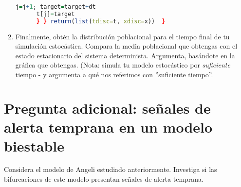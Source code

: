 \documentclass[10pt,letterpaper]{article}
\begin{document}
\begin{enumerate}
\begin{framed}
\begin{lstlisting}[language=R]
      j=j+1; target=target+dt
      t[j]=target
      } } return(list(tdisc=t, xdisc=x))  }
  \end{lstlisting}
\end{framed}
\item Finalmente, obtén la distribución poblacional para el tiempo final de tu simulación estocástica. Compara la media poblacional que obtengas con el estado estacionario del sistema determinista. Argumenta,  basándote en la gráfica que obtengas. (Nota: simula tu modelo estocástico por \textit{suficiente} tiempo - y argumenta a qué nos referimos con ''suficiente tiempo''.
\end{enumerate}


\section{Pregunta adicional: señales de alerta temprana en un modelo biestable}

Considera el modelo de Angeli \cite{Angeli2004} estudiado anteriormente.  Investiga si las bifurcaciones de este modelo presentan señales de alerta temprana.



 


\end{document}
